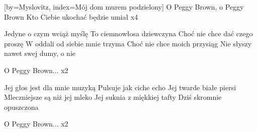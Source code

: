 [by={Myslovitz},
                     index={Mój dom murem podzielony}]
\beginverse
O Peggy Brown, o Peggy Brown
Kto Ciebie ukochać będzie umiał x4

\endverse
\beginverse

Jedyne o czym wciąż myślę
To ciemnowłosa dziewczyna
Choć nie chce dać czego proszę
W oddali od siebie mnie trzyma
Choć nie chce moich przysiąg
Nie słyszy nawet swej dumy, o nie

\endverse
\beginverse

O Peggy Brown... x2

Jej głos jest dla mnie muzyką
Pulsuje jak ciche echo
Jej twarde białe piersi
Mleczniejsze są niż jej mleko
Jej suknia z miękkiej tafty
Dziś skromnie opuszczona

\endverse
\beginverse

O Peggy Brown... x2

\endverse
\endsong